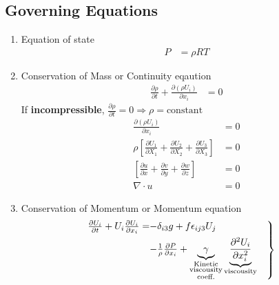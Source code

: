 \documentclass[fleqn,10pt]{SelfArx} %
\begin{document}
\subsection{Governing Equations}
\begin{enumerate}[noitemsep]
	\item Equation of state
	      \begin{align*}
		      P & = \rho RT \tag{7.1} \label{eq:idealgaeq}
	      \end{align*}
	\item Conservation of Mass or Continuity eqaution
	      \begin{align*}
		      \frac{\partial \rho}{\partial t} + \frac{\partial \left(\rho U_i\right)}{\partial x_i} & = 0 \tag{7.2} \label{eq:continuityeq}
	      \end{align*}
	      If \textbf{incompressible}, $\frac{\partial \rho}{\partial t} = 0 \Rightarrow \rho = \text{constant}$
	      \begin{align*}
		      \frac{\partial \left(\rho U_i\right)}{\partial x_i}                                                                        & = 0                                 \\
		      \rho\left[\frac{\partial U_1}{\partial X_1} + \frac{\partial U_2}{\partial X_2} + \frac{\partial U_3}{\partial X_3}\right] & = 0                                 \\
		      \left[\frac{\partial u}{\partial x} + \frac{\partial v}{\partial y} + \frac{\partial w}{\partial z}\right]                 & = 0                                 \\
		      \nabla \cdot u                                                                                                             & = 0 \tag{7.3} \label{eq:idealgaeq1}
	      \end{align*}
	\item Conservation of Momentum or Momentum equation
	      \begin{align*}
		      \begin{rcases}
			    \mspace{-20mu} \frac{\partial U_i}{\partial t} + U_i\frac{\partial U_i}{\partial x_i} = & \!\!\!\!\!\! -\delta_{i3}g + f\epsilon_{ij3}U_j \\  & \!\!\!\!\!\! - \frac{1}{\rho}\frac{\partial P}{\partial x_i} + \underbrace{\gamma}_{\substack{\text{Kinetic} \\ \text{viscousity} \\ \text{coeff.}}}\underbrace{\frac{\partial^2 U_i}{\partial x_i^2}}_{\text{viscousity}} \quad

\end{rcases}
\end{align*}
\end{enumerate}
\end{document}
